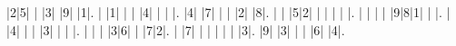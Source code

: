 \documentclass[letterpaper,10pt]{article}
\title{}
\author{Germán Avendaño Ramírez}
\begin{document}
\begin{sudoku}
|2|5| | |3| |9| |1|.
| |1| | | |4| | | |.
|4| |7| | | |2| |8|.
| | |5|2| | | | | |.
| | | | |9|8|1| | |.
| |4| | | |3| | | |.
| | | |3|6| | |7|2|.
| |7| | | | | | |3|.
|9| |3| | | |6| |4|.
\end{sudoku}
\end{document}
